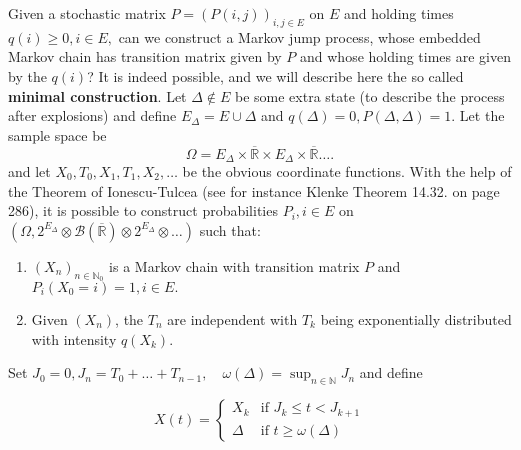 \documentclass[12pt,a4paper]{scrartcl}
\numberwithin{equation}{section}
\newcommand{\R}{\mathbb{R}} %
\newcommand{\N}{\mathbb{N}} %
\begin{document}
Given a stochastic matrix $P = \left(P\left(i,j\right)\right)_{i,j \in E}$ on $E$ and holding times $q\left(i\right) \geq 0,  i \in E,$ can we construct a Markov jump process, whose embedded Markov chain has transition matrix given by $P$ and whose holding times are given by the $q\left(i\right)$?
It is indeed possible, and we will describe here the so called \textbf{minimal construction}. Let $ \Delta \notin E$ be some extra state (to describe the process after explosions) and define $E_{\Delta} = E \cup \Delta$ and $q\left(\Delta\right) = 0, P\left(\Delta,\Delta\right) = 1.$  Let the sample space be
$$\Omega = E_{\Delta} \times \overline{\R} \times E_{\Delta} \times \overline{\R} \ldots. $$ and let $ X_0, T_0, X_1, T_1,X_2,\ldots $ be the obvious coordinate functions. With the help of the Theorem of Ionescu-Tulcea (see for instance Klenke \cite{klenke} Theorem 14.32. on page 286), it is possible to construct probabilities $P_i, i \in E$ on $\left(\Omega, 2^{E_{\Delta}} \otimes \mathcal{B}\left( \overline{\R}\right) \otimes 2^{E_{\Delta}} \otimes \ldots\right)$ such that:

\begin{enumerate}
\item $\left(X_n\right)_{n \in \N_0}$ is a Markov chain with transition matrix $P$ and $P_{i}\left(X_0= i\right) = 1, i \in E.$
\item Given $\left(X_n\right)$, the $T_n$ are independent with $T_k$ being exponentially distributed with intensity $q\left(X_k\right).$
\end{enumerate}

Set $J_0 = 0, J_n = T_0 + \ldots + T_{n-1}, \quad \omega\left(\Delta\right) = \sup_{n \in \N} J_n$ and define

$$ X\left(t\right) =\begin{cases} X_k & \mbox{if } J_k \leq t < J_{k+1} \\ \Delta & \mbox{if } t\geq \omega\left(\Delta\right) \end{cases}$$
\end{document}
